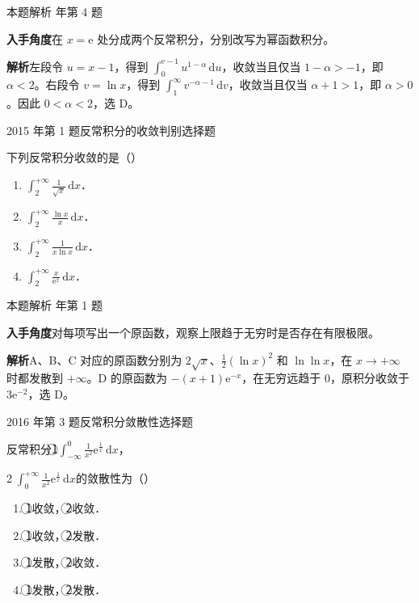 \documentclass[UTF8,zihao=-4,fontset=fandol]{ctexart}
\newcommand{\pickout}{\hfill（\hspace{1.4em}）}
\newcommand{\circnum}[1]{\textcircled{\scriptsize #1}}
\newenvironment{abcd}{\begin{enumerate}[label=\textup{(\Alph*)},leftmargin=2.3em,itemsep=1pt,topsep=4pt,parsep=1pt]}{\end{enumerate}}
\newcommand{\QuestionPage}[6]{%
  \par\noindent\begin{minipage}{\linewidth}
  \raggedright
  {\small\textcolor{black!60}{#3\quad #5}\hfill\textcolor{accent}{#2}}\par\smallskip}
\newcommand{\QuestionEnd}{\end{minipage}\par\medskip}
\newcommand{\QuestionPage}[6]{%
  \clearpage
  {\small\textcolor{accent}{#1\hfill #2}}\par\medskip
  {\small\textcolor{black!60}{#3\quad #5\hfill #6}}\par\vspace{9bp}}
\newcommand{\QuestionEnd}{}
\newenvironment{QuestionSolution}[1]{%
  \clearpage
  {\small\textcolor{black!60}{本题解析\quad #1}}\par\medskip
}{\par\clearpage}
\begin{document}
\begin{QuestionSolution}{2013 年第 4 题}
\textbf{入手角度}\quad 在 \(x=\mathrm{e}\) 处分成两个反常积分，分别改写为幂函数积分。

\textbf{解析}\quad 左段令 \(u=x-1\)，得到 \(\int_0^{\mathrm{e}-1}u^{1-\alpha}\,\mathrm{d}u\)，收敛当且仅当 \(1-\alpha>-1\)，即 \(\alpha<2\)。右段令 \(v=\ln x\)，得到 \(\int_1^\infty v^{-\alpha-1}\,\mathrm{d}v\)，收敛当且仅当 \(\alpha+1>1\)，即 \(\alpha>0\)。因此 \(0<\alpha<2\)，选 D。
\end{QuestionSolution}

\QuestionPage{3.5 反常积分}{选择题}{2015 年第 1 题}{1}{反常积分的收敛判别}{191 / 234}
下列反常积分收敛的是\pickout{}
\begin{abcd}
\item $\int_2^{+\infty} \frac{1}{\sqrt{x}}\,\mathrm{d} x$．
\item $\int_2^{+\infty} \frac{\ln x}{x}\,\mathrm{d} x$．
\item $\int_2^{+\infty} \frac{1}{x\ln x}\,\mathrm{d} x$．
\item $\int_2^{+\infty} \frac{x}{\mathrm{e}^x}\,\mathrm{d} x$．
\end{abcd}
\QuestionEnd

\begin{QuestionSolution}{2015 年第 1 题}
\textbf{入手角度}\quad 对每项写出一个原函数，观察上限趋于无穷时是否存在有限极限。

\textbf{解析}\quad A、B、C 对应的原函数分别为 \(2\sqrt{x}\)、\(\tfrac12(\ln x)^2\) 和 \(\ln\ln x\)，在 \(x\to+\infty\) 时都发散到 \(+\infty\)。D 的原函数为 \(-(x+1)\mathrm{e}^{-x}\)，在无穷远趋于 \(0\)，原积分收敛于 \(3\mathrm{e}^{-2}\)，选 D。
\end{QuestionSolution}

\QuestionPage{3.5 反常积分}{选择题}{2016 年第 3 题}{1}{反常积分敛散性}{192 / 234}
反常积分\circnum{1}$\int_{-\infty}^0 \frac{1}{x^2}\mathrm{e}^{\frac{1}{x}} \,\mathrm{d} x$，
\par\circnum{2}$\int_0^{\text{+}\infty} \frac{1}{x^2}\mathrm{e}^{\frac{1}{x}} \,\mathrm{d} x$的敛散性为\pickout{}
\begin{abcd}
\item \circnum{1}收敛，\circnum{2}收敛．
\item \circnum{1}收敛，\circnum{2}发散．
\item \circnum{1}发散，\circnum{2}收敛．
\item \circnum{1}发散，\circnum{2}发散．
\end{abcd}
\QuestionEnd
\end{document}

